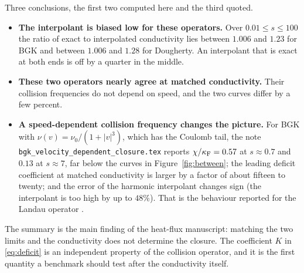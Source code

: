 Three conclusions, the first two computed here and the third quoted.
\begin{itemize}
  \item \textbf{The interpolant is biased low for these operators.} Over
    $0.01\le s\le100$ the ratio of exact to interpolated conductivity lies
    between $1.006$ and $1.23$ for BGK and between $1.006$ and $1.28$ for
    Dougherty. An interpolant that is exact at both ends is off by a
    quarter in the middle.
  \item \textbf{These two operators nearly agree at matched conductivity.}
    Their collision frequencies do not depend on speed, and the two curves
    differ by a few percent.
  \item \textbf{A speed-dependent collision frequency changes the picture.}
    For BGK with $\nu(v)=\nu_0/(1+|v|^3)$, which has the Coulomb tail, the
    note \texttt{bgk\_velocity\_dependent\_closure.tex} reports
    $\chi/\kappa_{\mathrm F}=0.57$ at $s\approx0.7$ and $0.13$ at $s\approx7$, far below
    the curves in Figure~\ref{fig:between}; the leading deficit coefficient
    at matched conductivity is larger by a factor of about fifteen to
    twenty; and the error of the harmonic interpolant changes sign (the
    interpolant is too high by up to $48\%$). That is the behaviour
    reported for the Landau operator \cite{Brodrick17}.
\end{itemize}
The summary is the main finding of the heat-flux manuscript: matching the
two limits and the conductivity does not determine the closure. The
coefficient $K$ in \eqref{eq:deficit} is an independent property of the
collision operator, and it is the first quantity a benchmark should test
after the conductivity itself.
